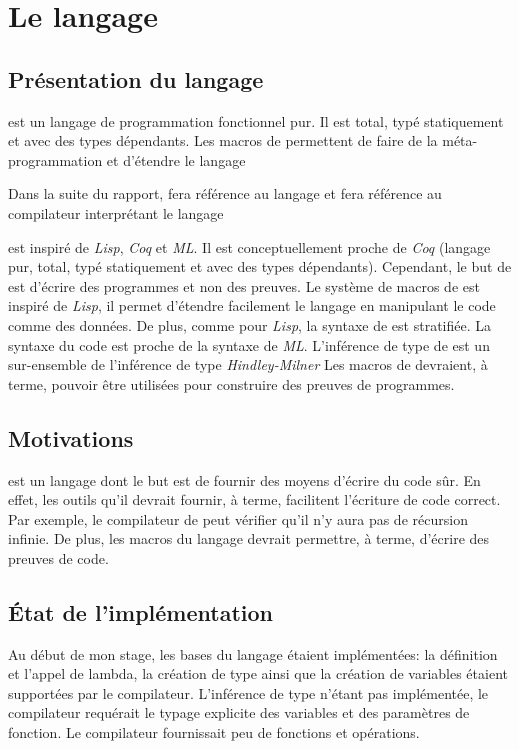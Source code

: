 \chapter{Le langage \typer{}}

    \section{Présentation du langage}
        \typer{} est un langage de programmation fonctionnel pur. Il est total, typé statiquement et avec des types dépendants.
        Les macros de \typer{} permettent de faire de la méta-programmation et d'étendre le langage

        Dans la suite du rapport, \say{\typer{}} fera référence au langage \typer{} et  fera référence au compilateur
        interprétant le langage \typer{}

        \typer{} est inspiré de \textit{Lisp}, \textit{Coq} et \textit{ML}.
        Il est conceptuellement proche de \textit{Coq} (langage pur, total, typé statiquement et avec des types dépendants). Cependant, le but de \typer{}
        est d'écrire des programmes et non des preuves.
        Le système de macros de \typer{} est inspiré de \textit{Lisp}, il permet d'étendre facilement le langage
        en manipulant le code comme des données. De plus, comme pour \textit{Lisp}, la syntaxe de \typer{} est stratifiée.
        La syntaxe du code est proche de la syntaxe de \textit{ML}. L'inférence de type de \typer{} est un sur-ensemble de l'inférence de type
        \textit{Hindley-Milner}
        Les macros de \typer{} devraient, à terme, pouvoir être utilisées pour construire des preuves de programmes.

    \section{Motivations}
        \typer{} est un langage dont le but est de fournir des moyens d'écrire du code sûr.
        En effet, les outils qu'il devrait fournir, à terme, facilitent l'écriture de code correct.
        Par exemple, le compilateur de \typer{} peut vérifier qu'il n'y aura pas de récursion infinie.
        De plus, les macros du langage devrait permettre, à terme, d'écrire des preuves de code.

    \section{État de l'implémentation}
        Au début de mon stage, les bases du langage étaient implémentées:
        la définition et l'appel de lambda, la création de type ainsi que la création de variables étaient supportées par le compilateur.
        L'inférence de type n'étant pas implémentée, le compilateur requérait le typage explicite des variables et des paramètres de fonction.
        Le compilateur fournissait peu de fonctions et opérations.

